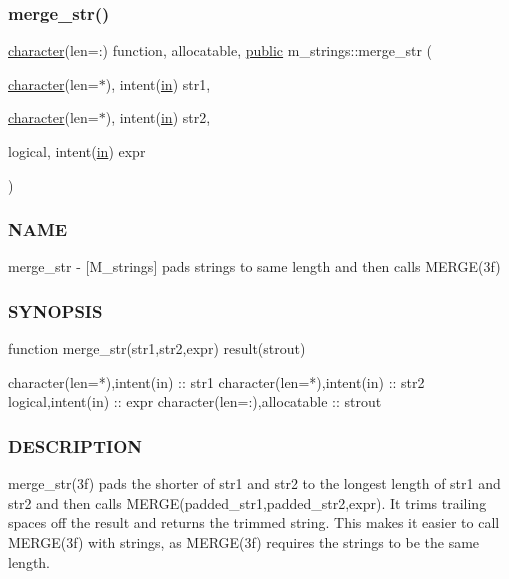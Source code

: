 \subsubsection{\texorpdfstring{merge\+\_\+str()}{merge\_str()}}
{\footnotesize\ttfamily \hyperlink{option__stopwatch_83_8txt_abd4b21fbbd175834027b5224bfe97e66}{character}(len=\+:) function, allocatable, \hyperlink{M__stopwatch_83_8txt_a2f74811300c361e53b430611a7d1769f}{public} m\+\_\+strings\+::merge\+\_\+str (\begin{DoxyParamCaption}\item[{\hyperlink{option__stopwatch_83_8txt_abd4b21fbbd175834027b5224bfe97e66}{character}(len=$\ast$), intent(\hyperlink{M__journal_83_8txt_afce72651d1eed785a2132bee863b2f38}{in})}]{str1,  }\item[{\hyperlink{option__stopwatch_83_8txt_abd4b21fbbd175834027b5224bfe97e66}{character}(len=$\ast$), intent(\hyperlink{M__journal_83_8txt_afce72651d1eed785a2132bee863b2f38}{in})}]{str2,  }\item[{logical, intent(\hyperlink{M__journal_83_8txt_afce72651d1eed785a2132bee863b2f38}{in})}]{expr }\end{DoxyParamCaption})}



\subsubsection*{N\+A\+ME}

merge\+\_\+str -\/ \mbox{[}M\+\_\+strings\mbox{]} pads strings to same length and then calls M\+E\+R\+G\+E(3f) 

\subsubsection*{S\+Y\+N\+O\+P\+S\+IS}

\begin{DoxyVerb}function merge_str(str1,str2,expr) result(strout)

 character(len=*),intent(in)     :: str1
 character(len=*),intent(in)     :: str2
 logical,intent(in)              :: expr
 character(len=:),allocatable    :: strout
\end{DoxyVerb}


\subsubsection*{D\+E\+S\+C\+R\+I\+P\+T\+I\+ON}

merge\+\_\+str(3f) pads the shorter of str1 and str2 to the longest length of str1 and str2 and then calls M\+E\+R\+G\+E(padded\+\_\+str1,padded\+\_\+str2,expr). It trims trailing spaces off the result and returns the trimmed string. This makes it easier to call M\+E\+R\+G\+E(3f) with strings, as M\+E\+R\+G\+E(3f) requires the strings to be the same length.

